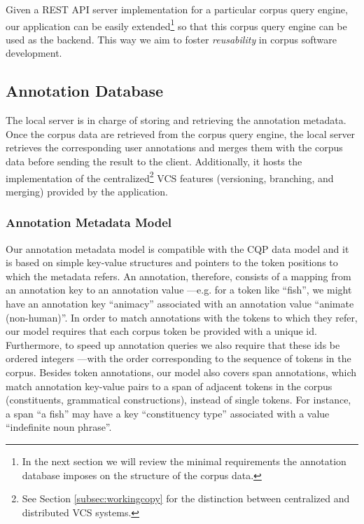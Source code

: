 \documentclass{sig-alternate}
\begin{document}
Given a REST API server implementation for a particular corpus query engine, our application can
be easily extended\footnote{
  In the next section we will review the minimal requirements the annotation database imposes on
the structure of the corpus data.
} so that this corpus query engine can be used as the backend. This way we aim to foster
\textit{reusability} in corpus software development.

\subsection{Annotation Database}\label{subsec:db}
The local server is in charge of storing and retrieving the annotation metadata. Once the corpus data
are retrieved from the corpus query engine, the local server retrieves the corresponding user
annotations and merges them with the corpus data before sending the result to the client.
Additionally, it hosts the implementation of the centralized\footnote{
  See Section \ref{subsec:workingcopy} for the distinction between centralized and distributed
  VCS systems.
} VCS features (versioning, branching, and merging) provided by the application.

\subsubsection{Annotation Metadata Model}\label{subsec:datamodel}

Our annotation metadata model is compatible with the CQP data model \cite{Christ1999} and
it is based on simple key-value structures and pointers to the token
positions to which the metadata refers. An annotation, therefore, consists of a mapping from
an annotation key to an annotation value ---e.g. for a token like ``fish'', we might
have an annotation key ``animacy'' associated with an annotation value ``animate (non-human)''.
In order to match annotations with the tokens to which they refer, our model requires that
each corpus token be provided with a unique id.
Furthermore, to speed up annotation queries we also require that these ids be ordered integers
---with the order corresponding to the sequence of tokens in the corpus.
Besides token annotations, our model also covers span annotations, which match annotation
key-value pairs to a span of adjacent tokens in the corpus (constituents, grammatical constructions),
instead of single tokens. For instance, a span ``a fish'' may have a key ``constituency type''
associated with a value ``indefinite noun phrase''.
\end{document}
